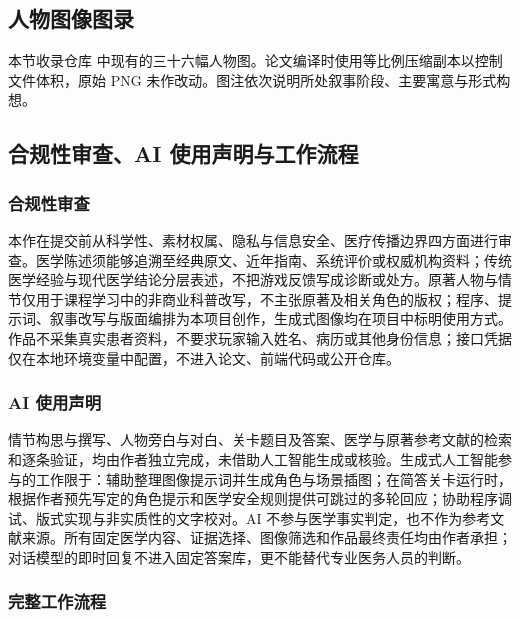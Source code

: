 \documentclass[lang=cn,a4paper,11pt,citestyle=gb7714-2015,bibstyle=gb7714-2015]{elegantpaper}
\begin{document}
\subsection{人物图像图录}

本节收录仓库  中现有的三十六幅人物图。论文编译时使用等比例压缩副本以控制文件体积，原始 PNG 未作改动。图注依次说明所处叙事阶段、主要寓意与形式构想。



\subsection{合规性审查、AI 使用声明与工作流程}\label{sec:ai-compliance}

\subsubsection{合规性审查}

本作在提交前从科学性、素材权属、隐私与信息安全、医疗传播边界四方面进行审查。医学陈述须能够追溯至经典原文、近年指南、系统评价或权威机构资料；传统医学经验与现代医学结论分层表述，不把游戏反馈写成诊断或处方。原著人物与情节仅用于课程学习中的非商业科普改写，不主张原著及相关角色的版权；程序、提示词、叙事改写与版面编排为本项目创作，生成式图像均在项目中标明使用方式。作品不采集真实患者资料，不要求玩家输入姓名、病历或其他身份信息；接口凭据仅在本地环境变量中配置，不进入论文、前端代码或公开仓库。

\subsubsection{AI 使用声明}

情节构思与撰写、人物旁白与对白、关卡题目及答案、医学与原著参考文献的检索和逐条验证，均由作者独立完成，未借助人工智能生成或核验。生成式人工智能参与的工作限于：辅助整理图像提示词并生成角色与场景插图；在简答关卡运行时，根据作者预先写定的角色提示和医学安全规则提供可跳过的多轮回应；协助程序调试、版式实现与非实质性的文字校对。AI 不参与医学事实判定，也不作为参考文献来源。所有固定医学内容、证据选择、图像筛选和作品最终责任均由作者承担；对话模型的即时回复不进入固定答案库，更不能替代专业医务人员的判断。

\subsubsection{完整工作流程}
\end{document}
